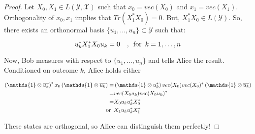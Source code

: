 \documentclass{article}
\begin{document}
\begin{proof}
    Let $X_0, X_1 \in L(\mathcal{Y},\mathcal{X})$ such that $x_0 = vec(X_0)$ and
    $x_1 = vec(X_1)$. Orthogonality of $x_0,x_1$ implies that $Tr(X_1^* X_0) =
    0$. But, $X_1^* X_0 \in L(\mathcal{Y})$. So, there exists an orthonormal
    basis $\{u_1,\ldots,u_n\} \subset \mathcal{Y}$ such that:

        \[ 
            u_k^* X_1^* X_0 u_k = 0  \quad,\enskip \text{for} \enskip
            k=1,\ldots,n
        \]
        
        Now, Bob measures with respect to $\{u_1,\ldots,u_n \}$ and tells Alice
        the result. Conditioned on outcome $k$, Alice holds either

        \begin{align*}
            \left( \mathds{1} \otimes \overline{u_k} \right)^* x_0 \left(
            \mathds{1} \otimes \overline{u_k} \right) =& \left( \mathds{1}
            \otimes u_k^* \right) vec(X_0) vec(X_0)^* \left( \mathds{1} \otimes
        \overline{u_k} \right) \\
        =& vec(X_0 u_k) vec(X_0 u_k)^* \\
        =& X_0 u_k u_k^* X_0^* \\
        \enskip \text{or} \enskip & X_1 u_k u_k^* X_1^* 
        \end{align*}
       
        These states are orthogonal, so Alice can distinguish them perfectly!
\end{proof}
\end{document}
